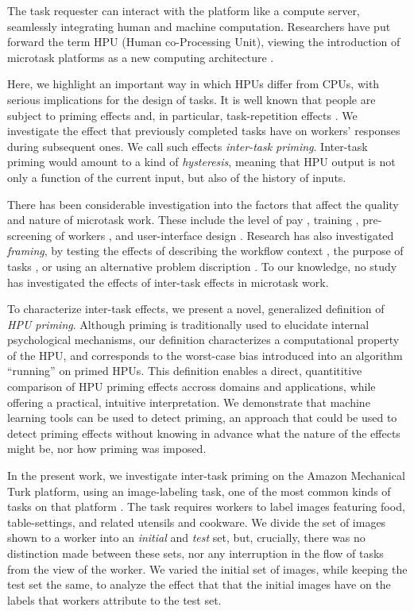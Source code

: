 \documentclass[12pt]{article}
\begin{document}
The task requester can interact with the platform like a compute server, 
seamlessly 
integrating human and machine computation.  Researchers have put forward the 
term HPU (Human co-Processing Unit), viewing the introduction of 
microtask platforms as a new computing architecture
\cite{5543192}.  

Here, we highlight an important way in which HPUs differ from CPUs, with 
serious implications for the design of tasks.  It is well known that people 
are subject to priming effects 
\cite{BJOP1796,No2007,beller1971priming} and, in particular, task-repetition effects
\cite{Gass1999549,sohn2001task}.  
We investigate the effect that previously completed tasks have on workers'
responses during subsequent ones. We call such effects 
\textit{inter-task priming}.  Inter-task priming would amount to a kind of
\textit{hysteresis}, meaning that HPU output is not only a function of the 
current input, but also of the history of inputs.

There has been considerable investigation into the factors that affect the 
quality and nature of microtask work.  These include the level of 
pay \cite{kazai2013analysis}, training \cite{le2010ensuring}, pre-screening of 
workers \cite{paolacci2010running}, and user-interface design 
\cite{Finnerty2013}.  Research has also investigated \textit{framing}, 
by testing the effects of describing the workflow context 
\cite{Kinnaird2012281}, the purpose of tasks 
\cite{chandler2013breaking}, or using an alternative problem discription
\cite{thibodeau2013natural}.  To our knowledge, no study has investigated the 
effects of inter-task effects in microtask work.

To characterize inter-task effects, we present a novel, generalized definition 
of \textit{HPU priming}. Although priming is traditionally used to elucidate 
internal 
psychological mechanisms, our definition characterizes a computational 
property of the HPU, and corresponds to the worst-case bias introduced into an 
algorithm ``running'' on primed HPUs. This definition enables a direct, 
quantititive comparison of HPU priming effects accross domains and 
applications, while offering a practical, intuitive interpretation. We 
demonstrate that machine learning tools can be used to detect priming, an 
approach that could be used to detect priming effects without knowing in 
advance what the nature of the effects might be, nor how priming was imposed.

In the present work, we investigate inter-task priming on the Amazon 
Mechanical Turk platform, using an image-labeling task, one of the most common 
kinds of tasks on that platform 
\cite{chandler2013breaking,Berinsky2012351,Finnerty2013,paolacci2010running}.  
The task requires workers to label images featuring food, table-settings, and 
related utensils and cookware. We divide the set of images shown to a worker 
into an \textit{initial} and \textit{test} set, but, crucially, there was no 
distinction made between these sets, nor any interruption in the flow of tasks 
from the view of the worker. We varied the initial set of images, while 
keeping the test set the same, to analyze the effect that that the initial 
images have on the labels that workers attribute to the test set.
\end{document}

